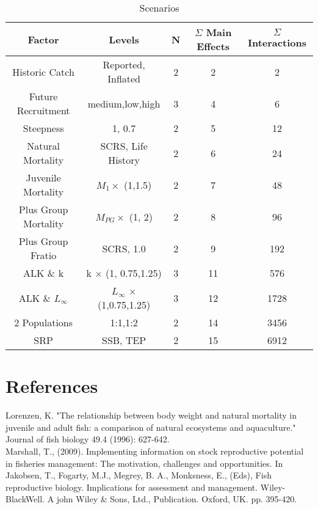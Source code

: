 \documentclass[a4paper,10pt]{article}
\begin{document}
   
\begin{table}
\begin{center}
\label{tab:datasumm}
\begin{tabular}{|ccccc|}
\hline
{\tiny Factor}                	& {\tiny Levels} 				& {\tiny N}	& {\tiny $\Sigma$ Main Effects}	& {\tiny $\Sigma$ Interactions}\\				
\hline\hline
{\tiny Historic Catch} 		& {\tiny Reported, Inflated}			& {\tiny 2}	& {\tiny 2}			& {\tiny 2}\\				
{\tiny Future Recruitment}	& {\tiny medium,low,high}			& {\tiny 3}	& {\tiny 4}			& {\tiny 6}\\ 	
{\tiny Steepness}		& {\tiny 1, 0.7}				& {\tiny 2}  	& {\tiny 5}			& {\tiny 12}\\
{\tiny Natural Mortality}	& {\tiny SCRS, Life History}			& {\tiny 2}  	& {\tiny 6}			& {\tiny 24}\\
{\tiny Juvenile Mortality} 	& {\tiny $M_1 \times$ (1,1.5)}   		& {\tiny 2}  	& {\tiny 7}			& {\tiny 48}\\
{\tiny Plus Group Mortality} 	& {\tiny $M_{PG} \times$ (1, 2)}		& {\tiny 2}  	& {\tiny 8}			& {\tiny 96}\\
{\tiny Plus Group Fratio} 	& {\tiny SCRS, 1.0}				& {\tiny 2}  	& {\tiny 9}			& {\tiny 192}\\
\hline\hline
{\tiny ALK \& k} 		& {\tiny k $\times$ (1, 0.75,1.25)}		& {\tiny 3}  	& {\tiny 11}			& {\tiny 576}\\
{\tiny ALK \& $L_{\infty}$} 	& {\tiny  $L_{\infty}$ $\times$ (1,0.75,1.25)}	& {\tiny 3}  	& {\tiny 12}			& {\tiny 1728}\\
{\tiny 2 Populations} 		& {\tiny 1:1,1:2}				& {\tiny 2}  	& {\tiny 14}			& {\tiny 3456}\\
{\tiny SRP} 			& {\tiny SSB, TEP}				& {\tiny 2}	& {\tiny 15}			& {\tiny 6912}\\
\hline
\end{tabular}
\end{center}
\caption{Scenarios}
\label{tab:scn}
\end{table}

\clearpage
\section{References}
Lorenzen, K. "The relationship between body weight and natural mortality in juvenile and adult fish: a comparison of natural ecosystems 
and aquaculture." Journal of fish biology 49.4 (1996): 627-642.\\


Marshall, T., (2009). Implementing information on stock reproductive potential in fisheries management: The motivation, challenges and opportunities.
In Jakobsen, T., Fogarty, M.J., Megrey, B. A., Monksness, E., (Eds), Fish reproductive biology. Implications for assessment and management. Wiley-BlackWell. A john Wiley
\& Sons, Ltd., Publication. Oxford, UK. pp. 395-420.
\end{document}
